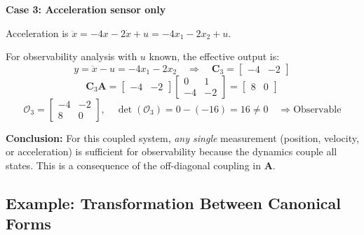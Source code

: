 \begin{example}
\textbf{Case 3: Acceleration sensor only}

Acceleration is $\ddot{x} = -4x - 2\dot{x} + u = -4x_1 - 2x_2 + u$.

For observability analysis with $u$ known, the effective output is:
\begin{equation}
y = \ddot{x} - u = -4x_1 - 2x_2 \quad \Rightarrow \quad \mathbf{C}_3 = \begin{bmatrix} -4 & -2 \end{bmatrix}
\end{equation}
\begin{equation}
\mathbf{C}_3\mathbf{A} = \begin{bmatrix} -4 & -2 \end{bmatrix}\begin{bmatrix} 0 & 1 \\ -4 & -2 \end{bmatrix} = \begin{bmatrix} 8 & 0 \end{bmatrix}
\end{equation}
\begin{equation}
\mathcal{O}_3 = \begin{bmatrix} -4 & -2 \\ 8 & 0 \end{bmatrix}, \quad \det(\mathcal{O}_3) = 0 - (-16) = 16 \neq 0 \quad \Rightarrow \text{Observable}
\end{equation}

\textbf{Conclusion:} For this coupled system, \textit{any single} measurement (position, velocity, or acceleration) is sufficient for observability because the dynamics couple all states. This is a consequence of the off-diagonal coupling in $\mathbf{A}$.
\end{example}

\subsection{Example: Transformation Between Canonical Forms}

